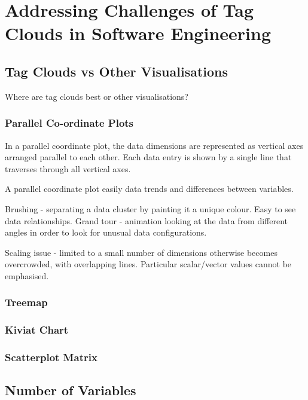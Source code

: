 \chapter{Addressing Challenges of Tag Clouds in Software Engineering}
\ifpdf
    \graphicspath{{Chapter4/Chapter4Figs/PNG/}{Chapter4/Chapter4Figs/PDF/}{Chapter4/Chapter4Figs/}}
\else
    \graphicspath{{Chapter4/Chapter4Figs/EPS/}{Chapter4/Chapter4Figs/}}
\fi

\section{Tag Clouds vs Other Visualisations}

Where are tag clouds best or other visualisations?

\subsection{Parallel Co-ordinate Plots}

In a parallel coordinate plot, the data dimensions are represented as vertical axes arranged parallel to each other. Each data entry is shown by a single line that traverses through all  vertical axes.

A parallel coordinate plot easily data trends and differences between variables. 

Brushing - separating a data cluster by painting it a unique colour. Easy to see data relationships. Grand tour - animation looking at the data from different angles in order to look for unusual data configurations.

Scaling issue - limited to a small number of dimensions otherwise becomes overcrowded, with overlapping lines. Particular scalar/vector values cannot be emphasised.

\subsection{Treemap}

\subsection{Kiviat Chart}

\subsection{Scatterplot Matrix}


\section{Number of Variables}

